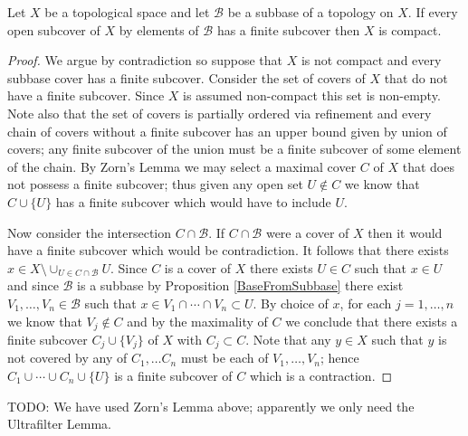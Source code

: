 \begin{thm}\label{AlexanderSubbaseTheorem}Let $X$ be a topological space and let $\mathcal{B}$ be a subbase of a topology on $X$.  If every open subcover of $X$ by elements of $\mathcal{B}$ has a finite subcover then $X$ is compact.
\end{thm}
\begin{proof}
We argue by contradiction so suppose that $X$ is not compact and every subbase cover has a finite subcover.  Consider the set of covers of $X$ that do not have a finite subcover.  Since $X$ is assumed non-compact this set is non-empty.  Note also that the set of covers is partially ordered via refinement and every chain of covers without a finite subcover has an upper bound given by union of covers; any finite subcover of the union must be a finite subcover of some element of the chain.  By Zorn's Lemma we may select a maximal cover $C$ of $X$ that does not possess a finite subcover; thus given any open set $U \notin C$ we know that $C \cup \lbrace U \rbrace$ has a finite subcover which would have to include $U$.

Now consider the intersection $C \cap \mathcal{B}$.  If $C \cap \mathcal{B}$ were a cover of $X$ then it would have a finite subcover which would be  contradiction.  It follows that there exists 
$x \in X \setminus \cup_{U \in C \cap \mathcal{B}} U$.  Since $C$ is a cover of $X$ there exists $U \in C$ such that $x \in U$ and since $\mathcal{B}$ is a subbase by Proposition \ref{BaseFromSubbase} there exist $V_1, \dotsc, V_n \in \mathcal{B}$ such that $x \in V_1 \cap \dotsb \cap V_n \subset U$.  By choice of $x$, for each $j=1, \dotsc, n$ we know that $V_j \notin C$ and by the maximality of $C$ we conclude that there exists a finite subcover $C_j \cup \lbrace V_j \rbrace$ of $X$ with $C_j \subset C$. Note that any $y \in X$ such that $y$ is not covered by any of $C_1, \dotsc C_n$ must be each of $V_1, \dotsc, V_n$; hence $C_1 \cup \dotsb \cup C_n \cup \lbrace U \rbrace$ is a finite subcover of $C$ which is a contraction.
\end{proof}
TODO: We have used Zorn's Lemma above; apparently we only need the Ultrafilter Lemma.

